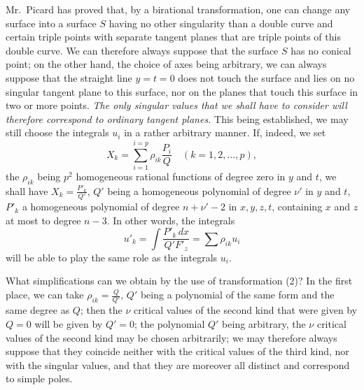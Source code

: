 \documentclass{article}
\begin{document}
Mr.~Picard has proved that, by a birational transformation, one can change any surface into a surface $S$ having no other singularity than a double curve and certain triple points with separate tangent planes that are triple points of this double curve. We can therefore always suppose that the surface $S$ has no conical point; on the other hand, the choice of axes being arbitrary, we can always suppose that the straight line $y = t = 0$ does not touch the surface and lies on no singular tangent plane to this surface, nor on the planes that touch this surface in two or more points. \emph{The only singular values that we shall have to consider will therefore correspond to ordinary tangent planes.}
This being established, we may still choose the integrals $u_{i}$ in a rather arbitrary manner. If, indeed, we set
\[
X_{k} = \sum_{i=1}^{i=p} \rho_{ik} \frac{P_{i}}{Q} \quad (k = 1, 2, \ldots, p), \tag{2}
\]
the $\rho_{ik}$ being $p^{2}$ homogeneous rational functions of degree zero in $y$ and $t$, we shall have $X_{k} = \frac{P'_{k}}{Q'}$, $Q'$ being a homogeneous polynomial of degree $\nu'$ in $y$ and $t$, $P'_{k}$ a homogeneous polynomial of degree $n + \nu' - 2$ in $x, y, z, t$, containing $x$ and $z$ at most to degree $n - 3$. In other words, the integrals
\[
u'_{k} = \int \frac{P'_{k}\,dx}{Q' F'_{z}} = \sum \rho_{ik} u_{i}
\]
will be able to play the same role as the integrals $u_{i}$.

What simplifications can we obtain by the use of transformation (2)? In the first place, we can take $\rho_{ik} = \frac{Q}{Q'}$, $Q'$ being a polynomial of the same form and the same degree as $Q$; then the $\nu$ critical values of the second kind that were given by $Q = 0$ will be given by $Q' = 0$; the polynomial $Q'$ being arbitrary, the $\nu$ critical values of the second kind may be chosen arbitrarily; we may therefore always suppose that they coincide neither with the critical values of the third kind, nor with the singular values, and that they are moreover all distinct and correspond to simple poles.
\end{document}
